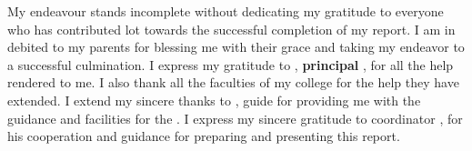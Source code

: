 My endeavour stands incomplete without dedicating my gratitude to everyone who has
contributed lot towards the successful completion of my \reportTitle{} report. I am in debited
to my parents for blessing me with their grace and taking my endeavor to a successful
culmination. I express my gratitude to \textbf{\guide{}}, \textbf{principal \prince{}}, \instis{} for all the help rendered
to me. I also thank all the faculties of my college for the help they have extended. I
extend my sincere thanks to \textbf{\guide{}},\reportTitle{} guide for providing me with the guidance and facilities for the \reportTitle{} . I
express my sincere gratitude to \reportTitle{} coordinator \textbf{\coord{}}, for his cooperation and guidance for preparing and presenting this \reportTitle{}
report.
 
